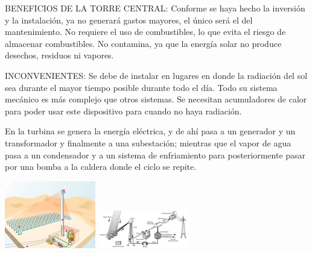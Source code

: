 \documentclass[12pt]{article}
\begin{document}
BENEFICIOS DE LA TORRE CENTRAL:
Conforme se haya hecho la inversión y la instalación, ya no generará gastos mayores, el único será el del mantenimiento.
No requiere el uso de combustibles, lo que evita el riesgo de almacenar combustibles.
No contamina, ya que la energía solar no produce desechos, residuos ni vapores.

INCONVENIENTES:
Se debe de instalar en lugares en donde la radiación del sol sea durante el mayor tiempo posible durante todo el día.
Todo su sistema mecánico es más complejo que otros sistemas.
Se necesitan acumuladores de calor para poder usar este dispositivo para cuando no haya radiación.

En la turbina se genera la energía eléctrica, y de ahí pasa a un generador y un transformador y finalmente a una subestación; mientras que el vapor de agua pasa a un condensador y a un sistema de enfriamiento para posteriormente pasar por una bomba a la caldera donde el ciclo se repite. \cite{IgualadaWebSite} \cite{SoliclimaWebSite} \cite{ClaudioWebSite}

\includegraphics[width=\textwidth]{unnamed.png}
\includegraphics[width=\textwidth]{unnamed (1).png}
\end{document}
